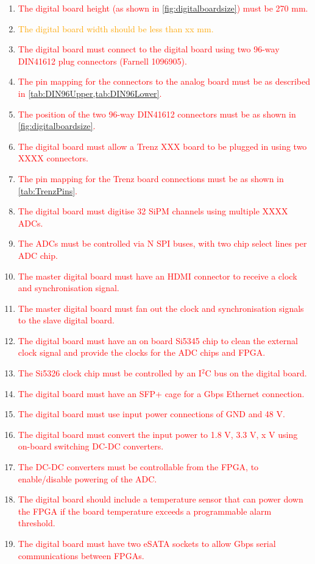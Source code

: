 \documentclass[a4paper]{article}
\newcommand{\must}[1]{\textcolor{red}{#1}}
\newcommand{\should}[1]{\textcolor{orange}{#1}}
\def\I2C{I$^2$C}
\begin{document}
\begin{enumerate}
    \item \must{The digital board height (as shown in \cref{fig:digitalboardsize}) must be 270 mm.}
    \item \should{The digital board width should be less than xx mm.}
    \item \must{The digital board must connect to the digital board using two 96-way DIN41612 plug connectors (Farnell 1096905).}
    \item \must{The pin mapping for the connectors to the analog board must be as described in \cref{tab:DIN96Upper,tab:DIN96Lower}.}
    \item \must{The position of the two 96-way DIN41612 connectors must be as shown in \cref{fig:digitalboardsize}.}
    \item \must{The digital board must allow a Trenz XXX board to be plugged in using two XXXX connectors.}
    \item \must{The pin mapping for the Trenz board connections must be as shown in \cref{tab:TrenzPins}.}
    \item \must{The digital board must digitise 32 SiPM channels using multiple XXXX ADCs.}
    \item \must{The ADCs must be controlled via N SPI buses, with two chip select lines per ADC chip.}
    \item \must{The master digital board must have an HDMI connector to receive a clock and synchronisation signal.}
    \item \must{The master digital board must fan out the clock and synchronisation signals to the slave digital board.}
    \item \must{The digital board must have an on board Si5345 chip to clean the external clock signal and provide the clocks for the ADC chips and FPGA.}
    \item \must{The Si5326 clock chip must be controlled by an \I2C bus on the digital board.}
    \item \must{The digital board must have an SFP+ cage for a Gbps Ethernet connection.}
    \item \must{The digital board must use input power connections of GND and 48 V.}
    \item \must{The digital board must convert the input power to 1.8 V, 3.3 V, x V using on-board switching DC-DC converters.}
    \item \must{The DC-DC converters must be controllable from the FPGA, to enable/disable powering of the ADC.}
    \item \must{The digital board should include a temperature sensor that can power down the FPGA if the board temperature exceeds a programmable alarm threshold.}
    \item \must{The digital board must have two eSATA sockets to allow Gbps serial communications between FPGAs.}
\end{enumerate}
\end{document}
